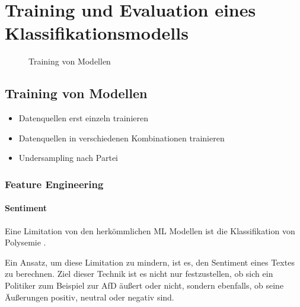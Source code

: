 
\chapter{Training und Evaluation eines Klassifikationsmodells} \label{ch:crispDm_2}


\begin{figure}[H]
    \centering
    \caption{Training von Modellen} \label{fig:dataFlow_2}
\end{figure}

\section{Training von Modellen} \label{sec:modeling}


\begin{itemize}
    \item Datenquellen erst einzeln trainieren
    \item Datenquellen in verschiedenen Kombinationen trainieren
    \item Undersampling nach Partei 
\end{itemize}

\subsection{Feature Engineering} \label{subsec:featureEngineering}


\subsubsection{Sentiment}

Eine Limitation von den herkömmlichen \ac{ML} Modellen ist die Klassifikation von Polysemie \autocite[48\psq]{kowsari_text_2019}. 


Ein Ansatz, um diese Limitation zu mindern, ist es, den Sentiment eines Textes zu berechnen. Ziel dieser Technik ist es nicht nur festzustellen, ob sich ein Politiker zum Beispiel zur \ac{AfD} äußert oder nicht, sondern ebenfalls, ob seine Äußerungen positiv, neutral oder negativ sind.

